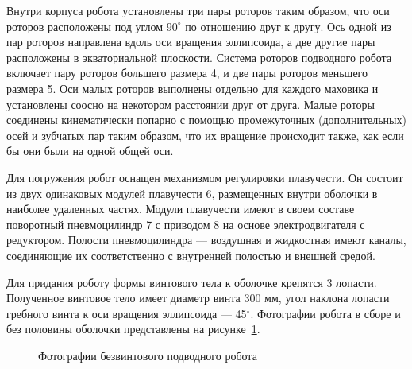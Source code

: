 Внутри корпуса робота установлены три пары роторов таким образом, что оси роторов расположены под углом $90^\circ$ по отношению друг к другу. Ось одной из пар роторов направлена вдоль оси вращения эллипсоида, а две другие пары расположены в экваториальной плоскости. 
Система роторов подводного робота включает пару роторов большего размера 4, и две пары роторов меньшего размера 5. %
Оси малых роторов выполнены отдельно для каждого маховика и установлены соосно на некотором расстоянии друг от друга. Малые роторы соединены кинематически попарно с помощью промежуточных (дополнительных) осей и зубчатых пар таким образом, что их вращение происходит также, как если бы они были на одной общей оси.

Для погружения робот оснащен механизмом регулировки плавучести. Он состоит из двух одинаковых модулей плавучести 6, размещенных внутри оболочки в наиболее удаленных частях. Модули плавучести имеют в своем составе поворотный пневмоцилиндр 7 с приводом 8 на основе электродвигателя с редуктором. Полости пневмоцилиндра --- воздушная и жидкостная имеют каналы, соединяющие их соответственно с внутренней полостью и внешней средой. %

Для придания роботу формы винтового тела к оболочке крепятся 3 лопасти. Полученное винтовое тело имеет диаметр винта 300 мм, угол наклона лопасти гребного винта к оси вращения эллипсоида --- 45$^{\circ}$. Фотографии робота в сборе и без половины оболочки представлены на рисунке~\ref{Photo_BPR}. 

\begin{figure}[h]
	\begin{minipage}[h]{0.5\linewidth}
	\end{minipage}
	\hfill
	\begin{minipage}[h]{0.5\linewidth}
	\end{minipage}	
	\caption{Фотографии безвинтового подводного робота}
	\label{Photo_BPR}
\end{figure}

